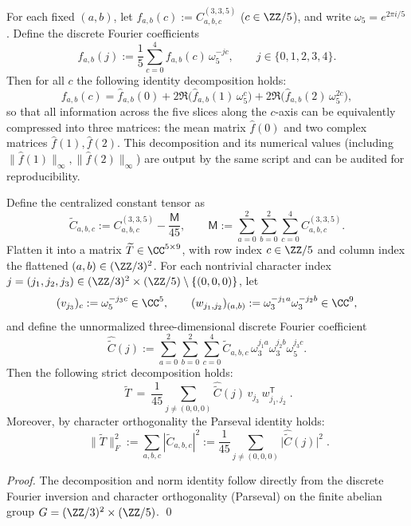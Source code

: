 \begin{remark}\label{prop:arity-335-fourier-fingerprint}
For each fixed $(a,b)$, let $f_{a,b}(c):=C^{(3,3,5)}_{a,b,c}$ ($c\in\ZZ/5$), and write $\omega_5=e^{2\pi i/5}$. Define the discrete Fourier coefficients
\[
\widehat f_{a,b}(j):=\frac15\sum_{c=0}^{4} f_{a,b}(c)\,\omega_5^{-jc},
\qquad j\in\{0,1,2,3,4\}.
\]
Then for all $c$ the following identity decomposition holds:
\[
f_{a,b}(c)
=\widehat f_{a,b}(0)
+2\Re\bigl(\widehat f_{a,b}(1)\,\omega_5^{c}\bigr)
+2\Re\bigl(\widehat f_{a,b}(2)\,\omega_5^{2c}\bigr),
\]
so that all information across the five slices along the $c$-axis can be equivalently compressed into three matrices: the mean matrix $\widehat f(0)$ and two complex matrices $\widehat f(1),\widehat f(2)$. This decomposition and its numerical values (including $\|\widehat f(1)\|_\infty,\|\widehat f(2)\|_\infty$) are output by the same script and can be audited for reproducibility.
\end{remark}

\begin{theorem}[Character decomposition \texorpdfstring{$\Rightarrow$}{=>} low-rank mechanism: rank-one outer product decomposition and Parseval energy identity for \texorpdfstring{$((3,3,5))$}{(3,3,5)}]\label{thm:arity-335-character-energy}
Define the centralized constant tensor as
\[
\widetilde C_{a,b,c}:=C^{(3,3,5)}_{a,b,c}-\frac{\mathsf{M}}{45},
\qquad
\mathsf{M}:=\sum_{a=0}^2\sum_{b=0}^2\sum_{c=0}^4 C^{(3,3,5)}_{a,b,c}.
\]
Flatten it into a matrix \(\widetilde T\in\CC^{5\times 9}\), with row index \(c\in\ZZ/5\) and column index the flattened \((a,b)\in(\ZZ/3)^2\).
For each nontrivial character index \(j=(j_1,j_2,j_3)\in(\ZZ/3)^2\times(\ZZ/5)\setminus\{(0,0,0)\}\), let
\[
(v_{j_3})_c:=\omega_5^{-j_3 c}\in\CC^{5},
\qquad
(w_{j_1,j_2})_{(a,b)}:=\omega_3^{-j_1 a}\omega_3^{-j_2 b}\in\CC^{9},
\]
and define the unnormalized three-dimensional discrete Fourier coefficient
\[
\widehat{\widetilde C}(j)
:=
\sum_{a=0}^2\sum_{b=0}^2\sum_{c=0}^4
\widetilde C_{a,b,c}\,\omega_3^{j_1 a}\omega_3^{j_2 b}\omega_5^{j_3 c}.
\]
Then the following strict decomposition holds:
\[
\boxed{\;
\widetilde T
\ =\
\frac{1}{45}\sum_{j\neq(0,0,0)}
\widehat{\widetilde C}(j)\,v_{j_3}\,w_{j_1,j_2}^{\mathsf T}\; }.
\]
Moreover, by character orthogonality the Parseval identity holds:
\[
\boxed{\;
\|\widetilde T\|_F^2
:=
\sum_{a,b,c}|\widetilde C_{a,b,c}|^2
:=
\frac{1}{45}\sum_{j\neq(0,0,0)}\bigl|\widehat{\widetilde C}(j)\bigr|^2\; }.
\]
\end{theorem}
\begin{proof}
The decomposition and norm identity follow directly from the discrete Fourier inversion and character orthogonality (Parseval) on the finite abelian group \(G=(\ZZ/3)^2\times(\ZZ/5)\). \qed
\end{proof}

